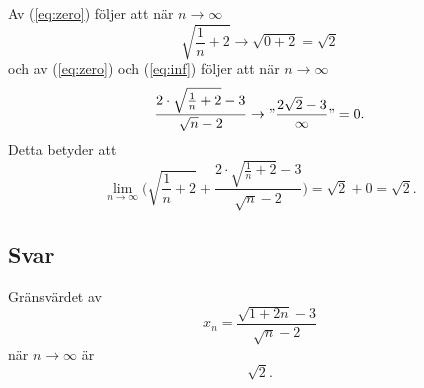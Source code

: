 \documentclass[11pt]{article}
\begin{document}
Av (\ref{eq:zero}) följer att när $n \rightarrow \infty$
$$\sqrt{\frac{1}{n} + 2} \rightarrow \sqrt{0 + 2} = \sqrt{2}$$
och av (\ref{eq:zero}) och (\ref{eq:inf}) följer att när $n \rightarrow \infty$
$$\frac{2\cdot\sqrt{\frac{1}{n} + 2} -3}{\sqrt{n}-2} \rightarrow "\frac{2\sqrt{2} -3}{\infty}" = 0.$$
Detta betyder att 
$$\lim_{n\rightarrow \infty} \Bigg( \sqrt{\frac{1}{n} + 2} + \frac{2\cdot\sqrt{\frac{1}{n} + 2} -3}{\sqrt{n}-2}\Bigg) = \sqrt{2} + 0 = \sqrt{2}.$$
\subsection{Svar}
Gränsvärdet av 
$$x_n = \frac{\sqrt{1+2n}-3}{\sqrt{n}-2}$$
när $n \rightarrow \infty$ är $$\sqrt{2}.$$
\end{document}
